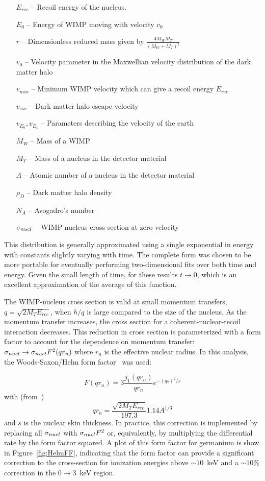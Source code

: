 		\begin{itemize}
			\item[$E_{rec}$]  -- Recoil energy of the nucleus. 
			\item[$E_{0}$] -- Energy of WIMP moving with velocity $v_{0}$
			\item[$r$] 	-- Dimensionless reduced mass given by 
					$\frac{4 M_{W} M_{T}}{(M_{W} + M_{T})^{2}}$
			\item[$v_{0}$] -- Velocity parameter in the Maxwellian velocity distribution of 
						the dark matter halo
			\item[$v_{min}$] -- Minimum WIMP velocity which can give a recoil energy $E_{rec}$
			\item[$v_{esc}$] -- Dark matter halo escape velocity
			\item[$v_{E_{0}}, v_{E_{1}}$] -- Parameters describing the velocity of the earth
			\item[$M_{W}$] -- Mass of a WIMP
			\item[$M_{T}$] -- Mass of a nucleus in the detector material
			\item[$A$] -- Atomic number of a nucleus in the detector material
			\item[$\rho_{D}$] -- Dark matter halo density	
			\item[$N_{A}$] -- Avogadro's number
			\item[$\sigma_{nucl}$] -- WIMP-nucleus cross section at zero velocity
		\end{itemize}			
This distribution is generally approximated using a single exponential in energy with constants slightly varying with time.  The complete form was chosen to be more portable for eventually performing two-dimensional fits over both time and energy.  Given the small length of time, for these results $t\to0$, which is an excellent approximation of the average of this function.  

The WIMP-nucleus cross section is valid at small momentum transfers, $q = \sqrt{2 M_{T} E_{rec}}$, when $h/q$ is large compared to the size of the nucleus.  As the momentum transfer increases, the cross section for a coherent-nuclear-recoil interaction decreases.  This reduction in cross section is parameterized with a form factor to account for the dependence on momentum transfer: $\sigma_{nucl} \to \sigma_{nucl} F^{2} (q r_{n})$ where $r_{n}$ is the effective nuclear radius.  In this analysis, the Woods-Saxon/Helm form factor~\cite{Helm56} was used:

		\begin{equation}
			F (q r_{n}) = 3 \frac{j_{1}(q r_{n})}{q r_{n}} e^{-(q s)^{2}/s}
			\label{eqn:WSHelmFF}
		\end{equation}
with (from~\cite{Lew96})
		\[
			q r_{n} = \frac{\sqrt{2  M_{T} E_{rec}}}{197.3} 1.14 A^{1/3}
		\]
and $s$ is the nuclear skin thickness.  In practice, this correction is implemented by replacing all $\sigma_{nucl}$ with $\sigma_{nucl} F^{2}$ or, equivalently, by multiplying the differential rate by the form factor squared.  A plot of this form factor for germanium is show in Figure~\ref{fig:HelmFF}, indicating that the form factor can provide a significant correction to the cross-section for ionization energies above $\sim10$~keV and a $\sim10$\% correction in the 0$\to$3~keV region.  


